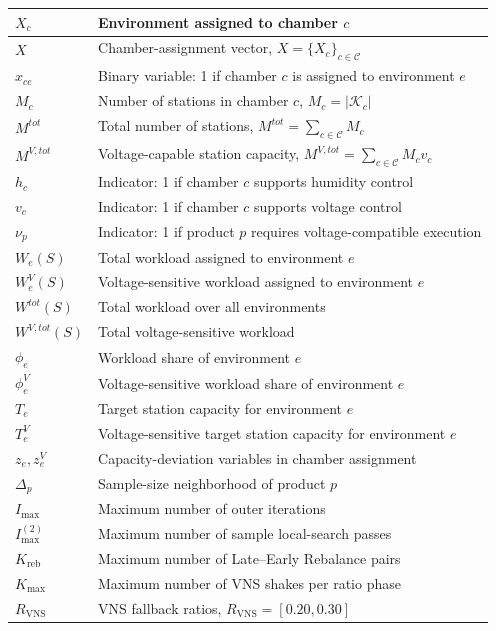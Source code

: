 \documentclass[11pt]{article}
\begin{document}
\begin{table}[H]
\begin{tabular}{|l|l|}
\(X_c\) & Environment assigned to chamber \(c\) \\ \hline
\(X\) & Chamber-assignment vector, \(X=\{X_c\}_{c\in\mathcal{C}}\) \\ \hline
\(x_{ce}\) & Binary variable: 1 if chamber \(c\) is assigned to environment \(e\) \\ \hline

\(M_c\) & Number of stations in chamber \(c\), \(M_c=|\mathcal{K}_c|\) \\ \hline
\(M^{tot}\) & Total number of stations, \(M^{tot}=\sum_{c\in\mathcal{C}}M_c\) \\ \hline
\(M^{V,tot}\) & Voltage-capable station capacity, \(M^{V,tot}=\sum_{c\in\mathcal{C}}M_cv_c\) \\ \hline
\(h_c\) & Indicator: 1 if chamber \(c\) supports humidity control \\ \hline
\(v_c\) & Indicator: 1 if chamber \(c\) supports voltage control \\ \hline
\(\nu_p\) & Indicator: 1 if product \(p\) requires voltage-compatible execution \\ \hline

\(W_e(S)\) & Total workload assigned to environment \(e\) \\ \hline
\(W_e^{V}(S)\) & Voltage-sensitive workload assigned to environment \(e\) \\ \hline
\(W^{tot}(S)\) & Total workload over all environments \\ \hline
\(W^{V,tot}(S)\) & Total voltage-sensitive workload \\ \hline
\(\phi_e\) & Workload share of environment \(e\) \\ \hline
\(\phi_e^{V}\) & Voltage-sensitive workload share of environment \(e\) \\ \hline
\(T_e\) & Target station capacity for environment \(e\) \\ \hline
\(T_e^{V}\) & Voltage-sensitive target station capacity for environment \(e\) \\ \hline
\(z_e,z_e^{V}\) & Capacity-deviation variables in chamber assignment \\ \hline

\(\Delta_p\) & Sample-size neighborhood of product \(p\) \\ \hline
\(I_{\max}\) & Maximum number of outer iterations \\ \hline
\(I_{\max}^{(2)}\) & Maximum number of sample local-search passes \\ \hline
\(K_{\mathrm{reb}}\) & Maximum number of Late--Early Rebalance pairs \\ \hline
\(K_{\max}\) & Maximum number of VNS shakes per ratio phase \\ \hline
\(R_{\mathrm{VNS}}\) & VNS fallback ratios, \(R_{\mathrm{VNS}}=[0.20,0.30]\) \\ \hline


\end{tabular}
\end{table}
\end{document}
